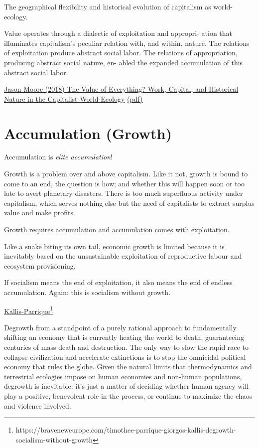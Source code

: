 \documentclass[
]{book}
\begin{document}
The geographical flexibility and historical evolution of capitalism as
world-ecology.

Value operates through a dialectic of exploitation and appropri-
ation that illuminates capitalism's peculiar relation with, and within,
nature. The relations of exploitation produce abstract social labor.
The relations of appropriation, producing abstract social nature, en-
abled the expanded accumulation of this abstract social labor.

\href{https://www.jstor.org/stable/90011611}{Jason Moore (2018) The Value of Everything? Work, Capital, and Historical Nature in the Capitalist World-Ecology}
\href{pdf/Moore_2017_Value_of_Everything.pdf}{(pdf)}

\hypertarget{accumulation-growth}{%
\chapter{Accumulation (Growth)}\label{accumulation-growth}}

Accumulation is \emph{elite accumulation}!

Growth is a problem over and above capitalism.
Like it not, growth is bound to come to an end,
the question is how;
and whether this will happen soon or too late to avert planetary disasters.
There is too much superfluous activity under capitalism,
which serves nothing else but the need of capitalists
to extract surplus value and make profits.

Growth requires accumulation and accumulation comes with exploitation.

Like a snake biting its own tail, economic growth is limited because it is inevitably based on the unsustainable exploitation of reproductive labour and ecosystem provisioning.

If socialism means the end of exploitation,
it also means the end of endless accumulation.
Again: this is socialism without growth.

\href{https://braveneweurope.com/timothee-parrique-giorgos-kallis-degrowth-socialism-without-growth}{Kallis-Parrique\footnote{\url{https://braveneweurope.com/timothee-parrique-giorgos-kallis-degrowth-socialism-without-growth}}}

Degrowth from a standpoint of a purely rational approach to fundamentally shifting an economy that is currently heating the world to death, guaranteeing centuries of mass death and destruction. The only way to slow the rapid race to collapse civilization and accelerate extinctions is to stop the omnicidal political economy that rules the globe. Given the natural limits that thermodynamics and terrestrial ecologies impose on human economies and non-human populations, degrowth is inevitable: it's just a matter of deciding whether human agency will play a positive, benevolent role in the process, or continue to maximize the chaos and violence involved.
\end{document}
